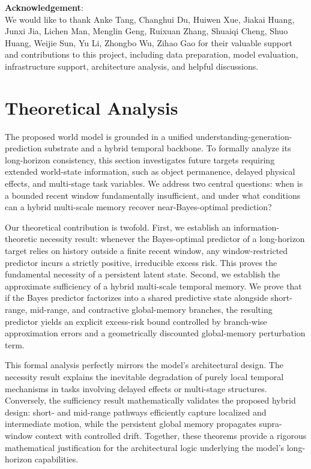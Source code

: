 \documentclass{llmxive}
\begin{document}
\textbf{Acknowledgement}: \\
We would like to thank Anke Tang, Changhui Du, Huiwen Xue, Jiakai Huang, Junxi Jia, Lichen Man, Menglin Geng, Ruixuan Zhang, Shuaiqi Cheng, Shuo Huang, Weijie Sun, Yu Li, Zhongbo Wu, Zihao Gao for their valuable support and contributions to this project, including data preparation, model evaluation, infrastructure support, architecture analysis, and helpful discussions.





\section{Theoretical Analysis}
\label{sec:theory}
The proposed world model is grounded in a unified understanding-generation-prediction substrate and a hybrid temporal backbone. To formally analyze its long-horizon consistency, this section investigates future targets requiring extended world-state information, such as object permanence, delayed physical effects, and multi-stage task variables. We address two central questions: when is a bounded recent window fundamentally insufficient, and under what conditions can a hybrid multi-scale memory recover near-Bayes-optimal prediction?

Our theoretical contribution is twofold. First, we establish an information-theoretic necessity result: whenever the Bayes-optimal predictor of a long-horizon target relies on history outside a finite recent window, any window-restricted predictor incurs a strictly positive, irreducible excess risk. This proves the fundamental necessity of a persistent latent state. Second, we establish the approximate sufficiency of a hybrid multi-scale temporal memory. We prove that if the Bayes predictor factorizes into a shared predictive state alongside short-range, mid-range, and contractive global-memory branches, the resulting predictor yields an explicit excess-risk bound controlled by branch-wise approximation errors and a geometrically discounted global-memory perturbation term.

This formal analysis perfectly mirrors the model's architectural design. The necessity result explains the inevitable degradation of purely local temporal mechanisms in tasks involving delayed effects or multi-stage structures. Conversely, the sufficiency result mathematically validates the proposed hybrid design: short- and mid-range pathways efficiently capture localized and intermediate motion, while the persistent global memory propagates supra-window context with controlled drift. Together, these theorems provide a rigorous mathematical justification for the architectural logic underlying the model's long-horizon capabilities.
\end{document}
